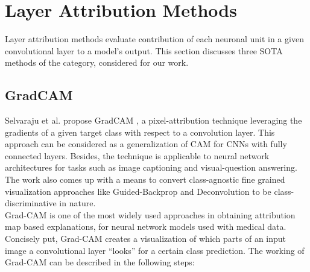\documentclass[../report.tex]{subfiles}
\begin{document}
\section{Layer Attribution Methods}
Layer attribution methods evaluate contribution of each neuronal unit in a given convolutional layer to a model's output. This section discusses three SOTA methods of the category, considered for our work.
\subsection{GradCAM}
\label{sec_gradcam}
Selvaraju et al. propose GradCAM \cite{selvaraju2017grad}, a pixel-attribution technique leveraging the gradients of a given target class with respect to a convolution layer. This approach can be considered as a generalization of CAM for CNNs with fully connected layers. Besides, the technique is applicable to neural network architectures for tasks such as image captioning and visual-question answering. The work also comes up with a means to convert class-agnostic fine grained visualization approaches like Guided-Backprop and Deconvolution to be class-discriminative in nature.\\
Grad-CAM is one of the most widely used approaches in obtaining attribution map based explanations, for neural network models used with medical data. Concisely put, Grad-CAM creates a visualization of which parts of an input image a convolutional layer “looks” for a certain class prediction. The working of Grad-CAM can be described in the following steps:
\end{document}
